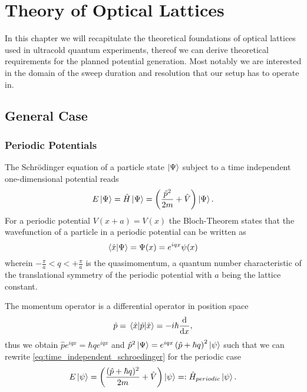 \chapter{Theory of Optical Lattices}

In this chapter we will recapitulate the theoretical foundations of optical
lattices used in ultracold quantum experiments, thereof we can derive
theoretical requirements for the planned potential generation. Most notably
we are interested in the domain of the sweep duration and resolution that
our setup has to operate in.

\section{General Case}

\subsection{Periodic Potentials}

The Schrödinger equation of a particle state $\ket{\Psi}$ subject to a time
independent one-dimensional potential reads
\begin{align}
  E\ket{\Psi}
  =\hat{H}\ket{\Psi}
  =\left(\frac{\hat{p}^2}{2m}+\hat{V}\right)\ket{\Psi}
  \label{eq:time_independent_schroedinger}.
\end{align}
For a periodic potential $V(x+a)=V(x)$ the Bloch-Theorem \cite{Ashcroft1976}
states that the wavefunction of a particle in a periodic potential can be
written as
\begin{equation}
  \braket{\hat{x}}{\Psi}
  =\Psi(x)
  =e^{iqx}\psi(x)
  \label{eq:bloch_theorem}
\end{equation}
wherein $-\frac{\pi}{a}<q<+\frac{\pi}{a}$ is the quasimomentum, a quantum
number characteristic of the translational symmetry of the periodic potential
\cite[p. 42]{Lewenstein2012} with $a$ being the lattice constant.

The momentum operator is a differential operator in position space
\begin{equation}
  \hat{p}
  =\expval{\hat{p}}{\hat{x}}
  =-i\hbar\dv{x}
  \label{eq:momentum_operator_in_position_space},
\end{equation}
thus we obtain $\hat{p}e^{iqx}=\hbar qe^{iqx}$ and
$\hat{p}^2\ket{\Psi}=e^{iqx}\left(\hat{p}+\hbar q\right)^2\ket{\psi}$ such
that we can rewrite \cref{eq:time_independent_schroedinger} for
the periodic case
\begin{equation}
  E\ket{\psi}
  =\left(\frac{(\hat{p}+\hbar q)^2}{2m}+\hat{V}\right)\ket{\psi}
  =:\hat{H}_{periodic}\ket{\psi}
  \label{eq:periodic_schroedinger}.
\end{equation}

